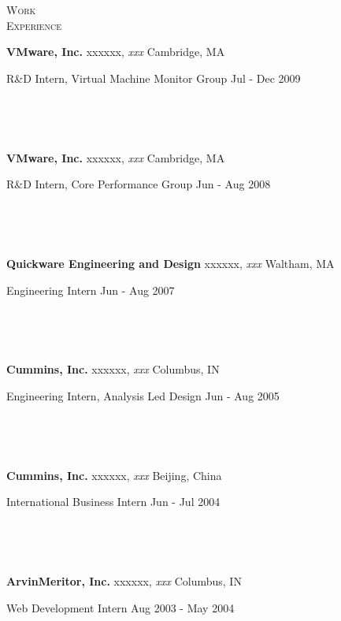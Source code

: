 \documentclass[10pt,times]{report}
\newlength{\sectiongap}
\newlength{\entrygap}
\newlength{\sectioncolwidth}
\newlength{\colgap}
\newlength{\stuffwidth}
\def\ifEqString#1#2{\def\testa{#1}\def\testb{#2}%
  \ifx\testa\testb}
\newenvironment{rtable}{
  \begin{minipage}{\textwidth}
  }{
  \end{minipage}
}
\newenvironment{rentry}[3][xxx]{
  \begin{minipage}[t]{\hsize}
    \textbf{#2}\ifEqString{#1}{xxx}\relax\else, \textit{#1}\fi
    \hspace{\stretch{1}} #3 \\
  }{
    \removelastskip
  \end{minipage}
  \\[\entrygap]  %
}
\newcommand{\rline}[2]{
  \begin{minipage}[t]{\hsize}
    #1 \hspace{\stretch{1}} #2
  \end{minipage} \\
}
\newenvironment{rsection}[1]{
  \begin{minipage}[t]{\sectioncolwidth}
    \textsc{#1}
  \end{minipage}
  \hspace{\colgap}
  \begin{minipage}[t]{\stuffwidth}
  }{
    \removelastskip
  \end{minipage}
  \\[\sectiongap]
}
\begin{document}
\begin{rtable}
\begin{rsection}{Work\\Experience}
    \begin{rentry}{VMware, Inc.}{Cambridge, MA}      
      \rline{R\&D Intern, Virtual Machine Monitor Group}{Jul - Dec 2009}
      \vspace{-.5em}
    \end{rentry}
    \begin{rentry}{VMware, Inc.}{Cambridge, MA}      
      \rline{R\&D Intern, Core Performance Group}{Jun - Aug 2008}
      \vspace{-.5em}
    \end{rentry}
    \begin{rentry}{Quickware Engineering and Design}{Waltham, MA}
      \rline{Engineering Intern}{Jun - Aug 2007} 
      \vspace{-.5em}
    \end{rentry}
    \begin{rentry}{Cummins, Inc.}{Columbus, IN}
      \rline{Engineering Intern, Analysis Led Design}{Jun - Aug 2005}
      \vspace{-.5em}
    \end{rentry}
    \begin{rentry}{Cummins, Inc.}{Beijing, China}
      \rline{International Business Intern}{Jun - Jul 2004} 
      \vspace{-.5em}
    \end{rentry}
    \begin{rentry}{ArvinMeritor, Inc.}{Columbus, IN}
      \rline{Web Development Intern}{Aug 2003 - May 2004}
      \vspace{-.5em}
    \end{rentry}
  \end{rsection}
\end{rtable}
\end{document}
